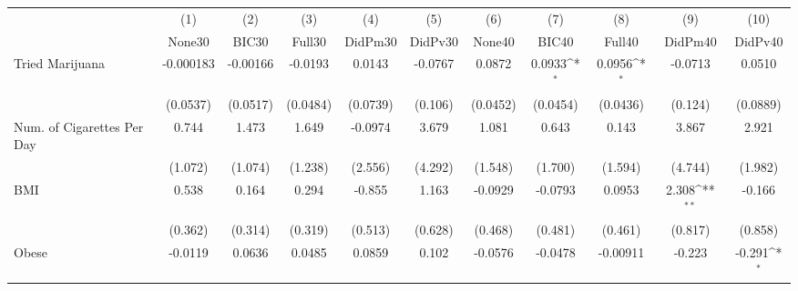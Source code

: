 {
\def\sym#1{\ifmmode^{#1}\else\(^{#1}\)\fi}
\begin{tabular}{l*{10}{c}}
\toprule
            &\multicolumn{1}{c}{(1)}&\multicolumn{1}{c}{(2)}&\multicolumn{1}{c}{(3)}&\multicolumn{1}{c}{(4)}&\multicolumn{1}{c}{(5)}&\multicolumn{1}{c}{(6)}&\multicolumn{1}{c}{(7)}&\multicolumn{1}{c}{(8)}&\multicolumn{1}{c}{(9)}&\multicolumn{1}{c}{(10)}\\
            &\multicolumn{1}{c}{None30}&\multicolumn{1}{c}{BIC30}&\multicolumn{1}{c}{Full30}&\multicolumn{1}{c}{DidPm30}&\multicolumn{1}{c}{DidPv30}&\multicolumn{1}{c}{None40}&\multicolumn{1}{c}{BIC40}&\multicolumn{1}{c}{Full40}&\multicolumn{1}{c}{DidPm40}&\multicolumn{1}{c}{DidPv40}\\
\midrule
Tried Marijuana&   -0.000183         &    -0.00166         &     -0.0193         &      0.0143         &     -0.0767         &      0.0872         &      0.0933\sym{*}  &      0.0956\sym{*}  &     -0.0713         &      0.0510         \\
            &    (0.0537)         &    (0.0517)         &    (0.0484)         &    (0.0739)         &     (0.106)         &    (0.0452)         &    (0.0454)         &    (0.0436)         &     (0.124)         &    (0.0889)         \\
\addlinespace
Num. of Cigarettes Per Day&       0.744         &       1.473         &       1.649         &     -0.0974         &       3.679         &       1.081         &       0.643         &       0.143         &       3.867         &       2.921         \\
            &     (1.072)         &     (1.074)         &     (1.238)         &     (2.556)         &     (4.292)         &     (1.548)         &     (1.700)         &     (1.594)         &     (4.744)         &     (1.982)         \\
\addlinespace
BMI         &       0.538         &       0.164         &       0.294         &      -0.855         &       1.163         &     -0.0929         &     -0.0793         &      0.0953         &       2.308\sym{**} &      -0.166         \\
            &     (0.362)         &     (0.314)         &     (0.319)         &     (0.513)         &     (0.628)         &     (0.468)         &     (0.481)         &     (0.461)         &     (0.817)         &     (0.858)         \\
\addlinespace
Obese       &     -0.0119         &      0.0636         &      0.0485         &      0.0859         &       0.102         &     -0.0576         &     -0.0478         &    -0.00911         &      -0.223         &      -0.291\sym{*}  \\

\end{tabular}}
